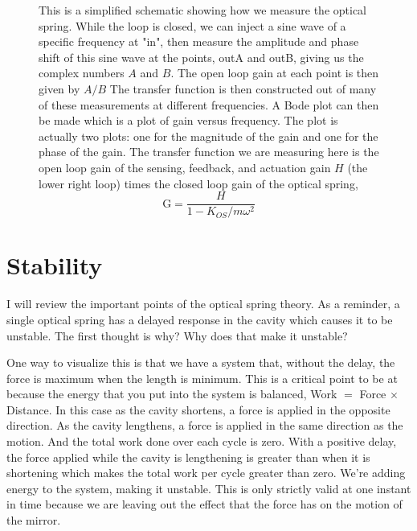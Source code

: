 \begin{figure}
\caption[Open Loop Gain Measurement]{This is a simplified schematic showing how
  we measure the optical spring.
  While the loop is closed, we can inject a sine wave of a specific frequency
  at "in", then measure the amplitude and phase shift of this sine wave at the
  points, outA and outB, giving us the complex numbers $A$ and $B$.
  The open loop gain at each point is then given by $A/B$
  The transfer function is then constructed out of many of these measurements
  at different frequencies.
  A Bode plot can then be made which is a plot of gain versus frequency.
  The plot is actually two plots: one for the magnitude of the gain and one
  for the phase of the gain.
  The transfer function we are measuring here is the open loop gain of the
  sensing, feedback, and actuation gain $H$ (the lower right loop) times the
  closed loop gain of the optical spring,
  \begin{equation}
  \mathrm{G} = \frac{H}{1-K_{OS}/m\omega^2}
  \end{equation}
  }
\label{fig:results:servoloop}
\end{figure}

\section{Stability}

I will review the important points of the optical spring theory.
As a reminder, a single optical spring has a delayed response in the cavity
which causes it to be unstable.
The first thought is why? Why does that make it unstable?

One way to visualize this is that we have a system that, without the delay,
the force is maximum when the length is minimum.
This is a critical point to be at because the energy that you put into the
system is balanced, Work $=$ Force $\times$ Distance.
In this case as the cavity shortens, a force is applied in the opposite
direction.
As the cavity lengthens, a force is applied in the same direction as the motion.
And the total work done over each cycle is zero.
With a positive delay, the force applied while the cavity is lengthening is
greater than when it is shortening which makes the total work per cycle greater
than zero.
We're adding energy to the system, making it unstable.
This is only strictly valid at one instant in time because we are leaving out
the effect that the force has on the motion of the mirror.

